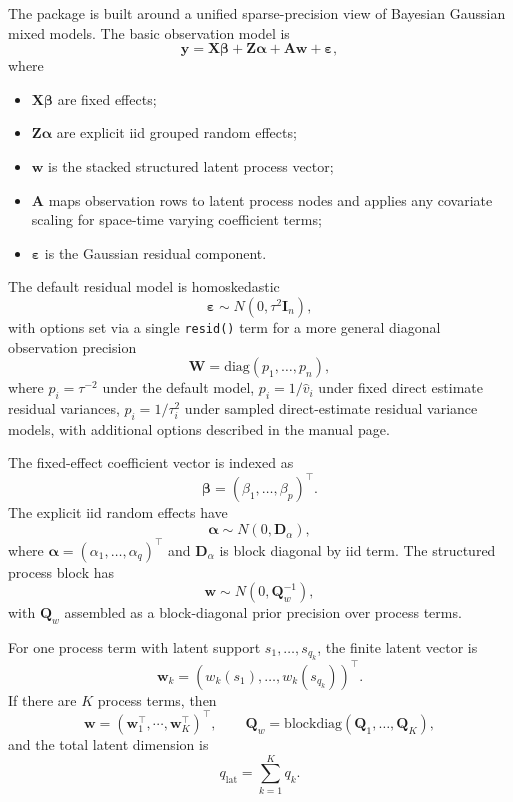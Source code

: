 \documentclass[11pt]{article}
\newcommand{\by}{\bm{y}}
\newcommand{\bw}{\bm{w}}
\newcommand{\balpha}{\bm{\alpha}}
\newcommand{\bbeta}{\bm{\beta}}
\newcommand{\beps}{\bm{\varepsilon}}
\newcommand{\bA}{\bm{A}}
\newcommand{\bD}{\bm{D}}
\newcommand{\bI}{\bm{I}}
\newcommand{\bQ}{\bm{Q}}
\newcommand{\bW}{\bm{W}}
\newcommand{\bX}{\bm{X}}
\newcommand{\bZ}{\bm{Z}}
\newcommand{\trans}{^\top}
\begin{document}
The package is built around a unified sparse-precision view of Bayesian Gaussian mixed models. The basic observation model is
\begin{equation}
  \by = \bX\bbeta + \bZ\balpha + \bA\bw + \beps,
\end{equation}
where
\begin{itemize}
\item $\bX\bbeta$ are fixed effects;
\item $\bZ\balpha$ are explicit iid grouped random effects;
\item $\bw$ is the stacked structured latent process vector;
\item $\bA$ maps observation rows to latent process nodes and applies any covariate scaling for space-time varying coefficient terms;
\item $\beps$ is the Gaussian residual component.
\end{itemize}

The default residual model is homoskedastic
\begin{equation}
  \beps \sim N(0, \tau^2 \bI_n),
\end{equation}
with options set via a single \texttt{resid()} term for a more general diagonal observation precision
\begin{equation}
  \bW = \mathrm{diag}(p_1,\ldots,p_n),
\end{equation}
where $p_i=\tau^{-2}$ under the default model, $p_i=1/\widehat v_i$ under fixed direct estimate residual variances, $p_i=1/\tau_i^2$ under sampled direct-estimate residual variance models, with additional options described in the manual page.

The fixed-effect coefficient vector is indexed as
\begin{equation}
  \bbeta = \left(\beta_1,\ldots,\beta_p\right)\trans .
\end{equation}
The explicit iid random effects have
\begin{equation}
  \balpha \sim N(0, \bD_\alpha),
\end{equation}
where $\balpha=(\alpha_1,\ldots,\alpha_q)\trans$ and $\bD_\alpha$ is block diagonal by iid term. The structured process block has
\begin{equation}
  \bw \sim N(0, \bQ_w^{-1}),
\end{equation}
with $\bQ_w$ assembled as a block-diagonal prior precision over process terms.

For one process term with latent support $s_1,\ldots,s_{q_k}$, the finite latent vector is
\begin{equation}
  \bw_k = \left(w_k(s_1), \ldots, w_k(s_{q_k})\right)\trans .
\end{equation}
If there are $K$ process terms, then
\begin{equation}
  \bw = \left( \bw_1\trans, \cdots, \bw_K\trans \right)\trans,\qquad
  \bQ_w = \mathrm{blockdiag}(\bQ_1,\ldots,\bQ_K),
\end{equation}
and the total latent dimension is
\begin{equation}
  q_{\mathrm{lat}} = \sum_{k=1}^K q_k.
\end{equation}
\end{document}
